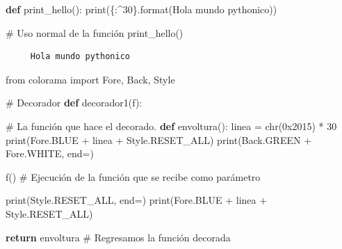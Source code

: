 \documentclass[
  spanish,
  letterpaper,
]{scrbook}
\newenvironment{Shaded}{\begin{snugshade}}{\end{snugshade}}
\newcommand{\BaseNTok}[1]{\textcolor[rgb]{0.68,0.00,0.00}{#1}}
\newcommand{\BuiltInTok}[1]{\textcolor[rgb]{0.00,0.23,0.31}{#1}}
\newcommand{\CommentTok}[1]{\textcolor[rgb]{0.37,0.37,0.37}{#1}}
\newcommand{\ControlFlowTok}[1]{\textcolor[rgb]{0.00,0.23,0.31}{\textbf{#1}}}
\newcommand{\DecValTok}[1]{\textcolor[rgb]{0.68,0.00,0.00}{#1}}
\newcommand{\ImportTok}[1]{\textcolor[rgb]{0.00,0.46,0.62}{#1}}
\newcommand{\KeywordTok}[1]{\textcolor[rgb]{0.00,0.23,0.31}{\textbf{#1}}}
\newcommand{\NormalTok}[1]{\textcolor[rgb]{0.00,0.23,0.31}{#1}}
\newcommand{\OperatorTok}[1]{\textcolor[rgb]{0.37,0.37,0.37}{#1}}
\newcommand{\SpecialCharTok}[1]{\textcolor[rgb]{0.37,0.37,0.37}{#1}}
\newcommand{\StringTok}[1]{\textcolor[rgb]{0.13,0.47,0.30}{#1}}
\theoremstyle{definition}
\theoremstyle{remark}
\begin{document}
\begin{Shaded}
\begin{Highlighting}[]
\KeywordTok{def}\NormalTok{ print\_hello():}
    \BuiltInTok{print}\NormalTok{(}\StringTok{\textquotesingle{}}\SpecialCharTok{\{:\^{}30\}}\StringTok{\textquotesingle{}}\NormalTok{.}\BuiltInTok{format}\NormalTok{(}\StringTok{\textquotesingle{}Hola mundo pythonico\textquotesingle{}}\NormalTok{))}
\end{Highlighting}
\end{Shaded}

\begin{Shaded}
\begin{Highlighting}[]
\CommentTok{\# Uso normal de la función}
\NormalTok{print\_hello()}
\end{Highlighting}
\end{Shaded}

\begin{verbatim}
     Hola mundo pythonico     
\end{verbatim}

\begin{Shaded}
\begin{Highlighting}[]
\ImportTok{from}\NormalTok{ colorama }\ImportTok{import}\NormalTok{ Fore, Back, Style}

\CommentTok{\# Decorador}
\KeywordTok{def}\NormalTok{ decorador1(f):}

    \CommentTok{\# La función que hace el decorado.}
    \KeywordTok{def}\NormalTok{ envoltura():}
\NormalTok{        linea }\OperatorTok{=} \BuiltInTok{chr}\NormalTok{(}\BaseNTok{0x2015}\NormalTok{) }\OperatorTok{*} \DecValTok{30}
        \BuiltInTok{print}\NormalTok{(Fore.BLUE }\OperatorTok{+}\NormalTok{ linea }\OperatorTok{+}\NormalTok{ Style.RESET\_ALL)}
        \BuiltInTok{print}\NormalTok{(Back.GREEN }\OperatorTok{+}\NormalTok{ Fore.WHITE, end}\OperatorTok{=}\StringTok{\textquotesingle{}\textquotesingle{}}\NormalTok{)}
        
\NormalTok{        f() }\CommentTok{\# Ejecución de la función que se recibe como parámetro}
        
        \BuiltInTok{print}\NormalTok{(Style.RESET\_ALL, end}\OperatorTok{=}\StringTok{\textquotesingle{}\textquotesingle{}}\NormalTok{)}
        \BuiltInTok{print}\NormalTok{(Fore.BLUE }\OperatorTok{+}\NormalTok{ linea }\OperatorTok{+}\NormalTok{ Style.RESET\_ALL)}

    \ControlFlowTok{return}\NormalTok{ envoltura }\CommentTok{\# Regresamos la función decorada}
\end{Highlighting}
\end{Shaded}
\end{document}
